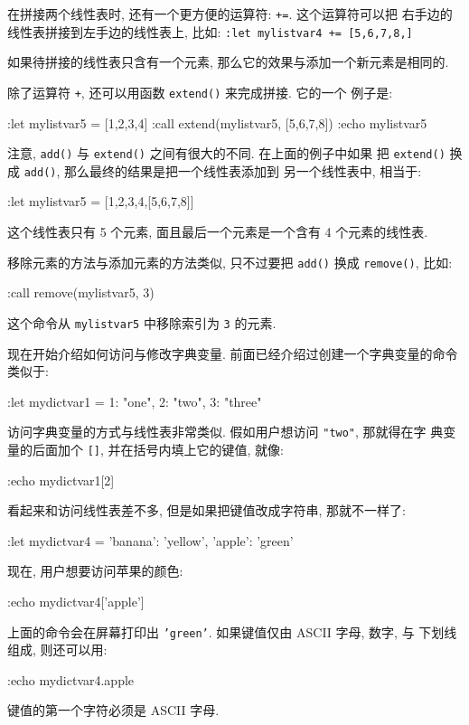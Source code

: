 \begin{warning}
    在拼接两个线性表时, 还有一个更方便的运算符: \texttt{+=}. 这个运算符可以把
    右手边的线性表拼接到左手边的线性表上, 比如: \texttt{:let mylistvar4 +=
    [5,6,7,8,]}
\end{warning}

如果待拼接的线性表只含有一个元素, 那么它的效果与添加一个新元素是相同的.

除了运算符 \texttt{+}, 还可以用函数 \texttt{extend()} 来完成拼接. 它的一个
例子是:
\begin{vimcode}
:let mylistvar5 = [1,2,3,4]
:call extend(mylistvar5, [5,6,7,8])
:echo mylistvar5
\end{vimcode}
注意, \texttt{add()} 与 \texttt{extend()} 之间有很大的不同. 在上面的例子中如果
把 \texttt{extend()} 换成 \texttt{add()}, 那么最终的结果是把一个线性表添加到
另一个线性表中, 相当于:
\begin{vimcode}
:let mylistvar5 = [1,2,3,4,[5,6,7,8]]
\end{vimcode}
这个线性表只有 5 个元素, 面且最后一个元素是一个含有 4 个元素的线性表.

移除元素的方法与添加元素的方法类似, 只不过要把 \texttt{add()} 换成
\texttt{remove()}, 比如:
\begin{vimcode}
:call remove(mylistvar5, 3)
\end{vimcode}
这个命令从 \texttt{mylistvar5} 中移除索引为 \texttt{3} 的元素.

现在开始介绍如何访问与修改字典变量. 前面已经介绍过创建一个字典变量的命令
类似于:
\begin{vimcode}
:let mydictvar1 = {1: "one", 2: "two", 3: "three"}
\end{vimcode}

访问字典变量的方式与线性表非常类似. 假如用户想访问 \texttt{"two"}, 那就得在字
典变量的后面加个 \texttt{[]}, 并在括号内填上它的键值, 就像:
\begin{vimcode}
:echo mydictvar1[2]
\end{vimcode}

看起来和访问线性表差不多, 但是如果把键值改成字符串, 那就不一样了:
\begin{vimcode}
:let mydictvar4 = {'banana': 'yellow', 'apple': 'green'}
\end{vimcode}
现在, 用户想要访问苹果的颜色:
\begin{vimcode}
:echo mydictvar4['apple']
\end{vimcode}
上面的命令会在屏幕打印出 \texttt{'green'}. 如果键值仅由 ASCII 字母, 数字, 与
下划线组成, 则还可以用:
\begin{vimcode}
:echo mydictvar4.apple
\end{vimcode}
键值的第一个字符必须是 ASCII 字母.

